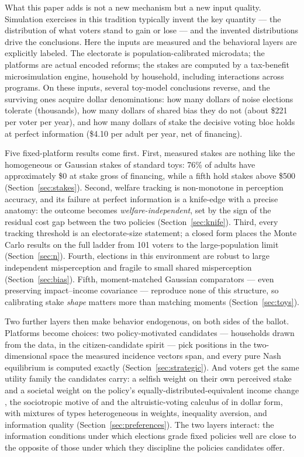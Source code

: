 \documentclass[11pt]{article}
\begin{document}
What this paper adds is not a new mechanism but a new input quality.
Simulation exercises in this tradition typically invent the key
quantity --- the distribution of what voters stand to gain or lose ---
and the invented distributions drive the conclusions. Here the inputs are measured and the behavioral layers are explicitly
labeled. The electorate is population-calibrated microdata; the platforms are
actual encoded reforms; the stakes are computed by a tax-benefit
microsimulation engine, household by household, including interactions
across programs. On these inputs, several toy-model conclusions reverse,
and the surviving ones acquire dollar denominations: how many dollars of
noise elections tolerate (thousands), how many dollars of shared bias they
do not (about \$221 per voter per year), and how many dollars of stake the
decisive voting bloc holds at perfect information (\$4.10 per adult per
year, net of financing).

Five fixed-platform results come first. First, measured stakes are
nothing like the homogeneous or Gaussian stakes of standard toys: 76\% of
adults have approximately \$0 at stake gross of financing, while a fifth
hold stakes above \$500 (Section~\ref{sec:stakes}). Second, welfare
tracking is non-monotone in perception accuracy, and its failure at
perfect information is a knife-edge with a precise anatomy: the outcome
becomes \emph{welfare-independent}, set by the sign of the residual cost
gap between the two policies (Section~\ref{sec:knife}). Third, every
tracking threshold is an electorate-size statement; a closed form places
the Monte Carlo results on the full ladder from 101 voters to the
large-population limit (Section~\ref{sec:n}). Fourth, elections in this
environment are robust to large independent misperception and fragile to
small shared misperception (Section~\ref{sec:bias}). Fifth,
moment-matched Gaussian comparators --- even preserving impact--income
covariance --- reproduce none of this structure, so calibrating stake
\emph{shape} matters more than matching moments (Section~\ref{sec:toys}).

Two further layers then make behavior endogenous, on both sides of the
ballot. Platforms become choices: two policy-motivated candidates
\citep{wittman1983, calvert1985} --- households drawn from the data, in
the citizen-candidate spirit \citep{osborne1996, besley1997} --- pick
positions in the two-dimensional space the measured incidence vectors
span, and every pure Nash equilibrium is computed exactly
(Section~\ref{sec:strategic}). And voters get the same utility family
the candidates carry: a selfish weight on their own perceived stake and
a societal weight on the policy's equally-distributed-equivalent income
change \citep{atkinson1970}, the sociotropic motive of
\citet{kinder1981} and the altruistic-voting calculus of
\citet{edlin2007} in dollar form, with mixtures of types heterogeneous
in weights, inequality aversion, and information quality
(Section~\ref{sec:preferences}). The two layers interact: the
information conditions under which elections grade fixed policies well
are close to the opposite of those under which they discipline the
policies candidates offer.
\end{document}

